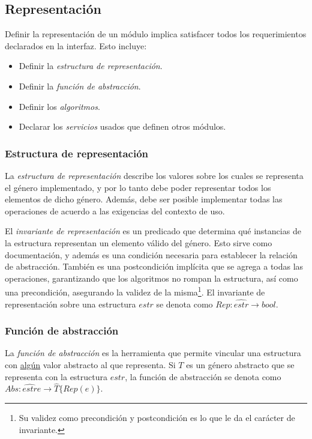 \documentclass{article}
\begin{document}
\subsection{Representación}

Definir la representación de un módulo implica satisfacer todos los requerimientos declarados en la interfaz. Esto incluye:
\begin{itemize}
    \item Definir la \textit{estructura de representación}.
    \item Definir la \textit{función de abstracción}.
    \item Definir los \textit{algoritmos}.
    \item Declarar los \textit{servicios} usados que definen otros módulos.
\end{itemize}

\subsubsection{Estructura de representación}

La \textit{estructura de representación} describe los valores sobre los cuales se representa el género implementado, y por lo tanto debe poder representar todos los elementos de dicho género. Además, debe ser posible implementar todas las operaciones de acuerdo a las exigencias del contexto de uso.

El \textit{invariante de representación} es un predicado que determina qué instancias de la estructura representan un elemento válido del género. Esto sirve como documentación, y además es una condición necesaria para establecer la relación de abstracción. También es una postcondición implícita que se agrega a todas las operaciones, garantizando que los algoritmos no rompan la estructura, así como una precondición, asegurando la validez de la misma\footnote{Su validez como precondición y postcondición es lo que le da el carácter de invariante.}. El invariante de representación sobre una estructura $estr$ se denota como $Rep: \hat{estr} \rightarrow bool$.

\subsubsection{Función de abstracción}

La \textit{función de abstracción} es la herramienta que permite vincular una estructura con \underline{algún} valor abstracto al que representa. Si $T$ es un género abstracto que se representa con la estructura $estr$, la función de abstracción se denota como $Abs: \hat{estr} e \rightarrow \hat{T} \{Rep(e)\}$.
\end{document}
